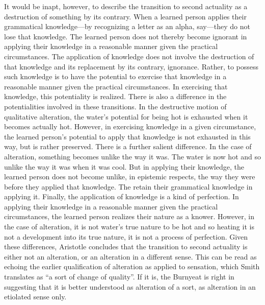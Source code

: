 It would be inapt, however, to describe the transition to second actuality as a destruction of something by its contrary. When a learned person applies their grammatical knowledge---by recognizing a letter as an alpha, say---they do not lose that knowledge. The learned person does not thereby become ignorant in applying their knowledge in a reasonable manner given the practical circumstances. The application of knowledge does not involve the destruction of that knowledge and its replacement by its contrary, ignorance. Rather, to possess such knowledge is to have the potential to exercise that knowledge in a reasonable manner given the practical circumstances. In exercising that knowledge, this potentiality is realized. There is also a difference in the potentialities involved in these transitions. In the destructive motion of qualitative alteration, the water's potential for being hot is exhausted when it becomes actually hot. However, in exercising knowledge in a given circumstance, the learned person's potential to apply that knowledge is not exhausted in this way, but is rather preserved. There is a further salient difference. In the case of alteration, something becomes unlike the way it was. The water is now hot and so unlike the way it was when it was cool. But in applying their knowledge, the learned person does not become unlike, in epistemic respects, the way they were before they applied that knowledge. The retain their grammatical knowledge in applying it. Finally, the application of knowledge is a kind of perfection. In applying their knowledge in a reasonable manner given the practical circumstances, the learned person realizes their nature as a knower. However, in the case of alteration, it is not water's true nature to be hot and so heating it is not a development into its true nature, it is not a process of perfection. Given these differences, Aristotle concludes that the transition to second actuality is either not an alteration, or an alteration in a different sense. This can be read as echoing the earlier qualification of alteration as applied to sensation, which Smith translates as ``a sort of change of quality''. If it is, the Burnyeat is right in suggesting that it is better understood as alteration of a sort, as alteration in an etiolated sense only.

